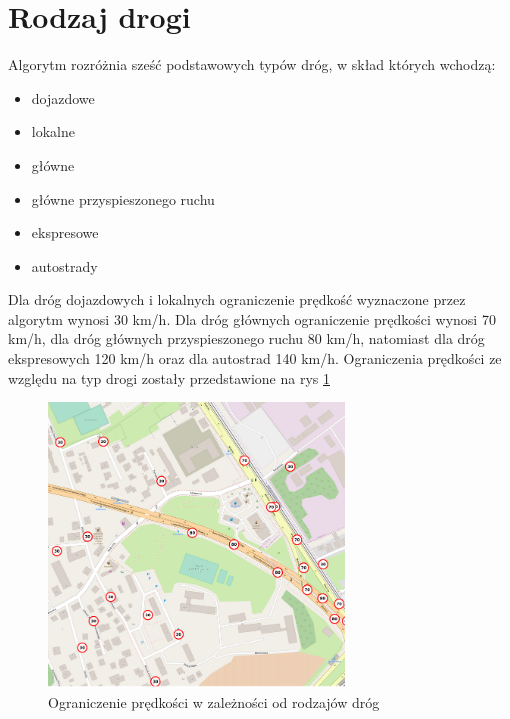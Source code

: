 \newpage
\section{Rodzaj drogi}
Algorytm rozróżnia sześć podstawowych typów dróg, w skład których wchodzą:
\begin{itemize}
\item dojazdowe
\item lokalne
\item główne
\item główne przyspieszonego ruchu
\item ekspresowe
\item autostrady
\end{itemize}

Dla dróg dojazdowych i lokalnych ograniczenie prędkość wyznaczone przez algorytm wynosi 30 km/h. Dla dróg głównych ograniczenie prędkości wynosi 70 km/h, dla dróg głównych przyspieszonego ruchu 80 km/h, natomiast dla dróg ekspresowych 120 km/h oraz dla autostrad 140 km/h. Ograniczenia prędkości ze względu na typ drogi zostały przedstawione na rys \ref{sec:typeOfRoad}
\begin{figure}[h]
\caption{Ograniczenie prędkości w zależności od rodzajów dróg}
\label{sec:typeOfRoad}
\centering
\includegraphics[width=0.7\textwidth]{typeOfRoad}
\end{figure}

\newpage
